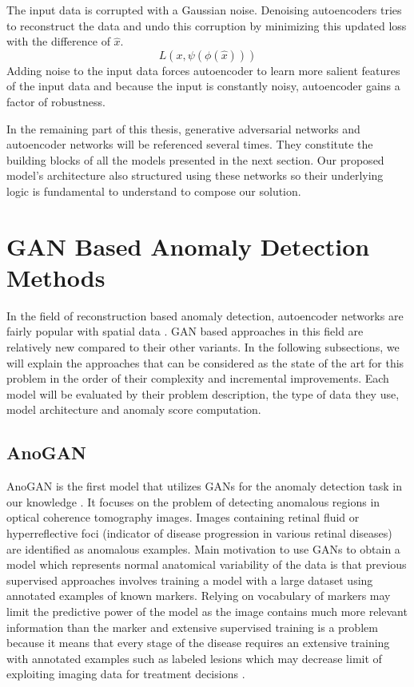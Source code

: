 {The input data is corrupted with a Gaussian noise. Denoising autoencoders tries to
reconstruct the data and undo this corruption by minimizing this updated loss with the difference of
$\hat{x}$.
$$
L(x, \psi(\phi(\hat{x})))
$$
Adding noise to the input data forces autoencoder to learn more salient features of the input data and because 
the input is constantly noisy, autoencoder gains a factor of robustness.

In the remaining part of this thesis, generative adversarial networks and autoencoder networks will be referenced 
several times. They constitute the building blocks of all the models presented in the next section. Our proposed 
model's architecture also structured using these networks so their underlying logic is fundamental to understand 
to compose our solution.

\section{GAN Based Anomaly Detection Methods}
\label{sec:gan_based_sota}
In the field of reconstruction based anomaly detection, autoencoder networks 
are fairly popular with spatial data \cite{baldi2012autoencoders,leveau2017adversarial,an2015variational}.
GAN based approaches in this field are relatively new compared to their other variants.
In the following subsections, we will explain the approaches that can be considered as the state of
the art for this problem in the order of their complexity and incremental improvements. Each
model will be evaluated by their problem description, the type of data they use, model
architecture and anomaly score computation. 

\subsection{AnoGAN}
\label{sec:anogan}
 AnoGAN is the first model that utilizes GANs for the anomaly detection task in our knowledge
\cite{Schlegl2017UnsupervisedAD}. It focuses on the problem of detecting anomalous regions in optical
coherence tomography images. Images containing retinal fluid or hyperreflective foci (indicator of
disease progression in various retinal diseases) are identified as anomalous examples. Main
motivation to use GANs to obtain a model which represents normal anatomical variability of the data
is that previous supervised approaches involves training a model with a large dataset using
annotated examples of known markers. Relying on vocabulary of markers may limit the predictive power
of the model as the image contains much more relevant information than the marker and extensive
supervised training is a problem because it means that every stage of the disease requires an
extensive training with annotated examples such as labeled lesions which may decrease limit of
exploiting imaging data for treatment decisions \cite{Schlegl2017UnsupervisedAD}.


}
